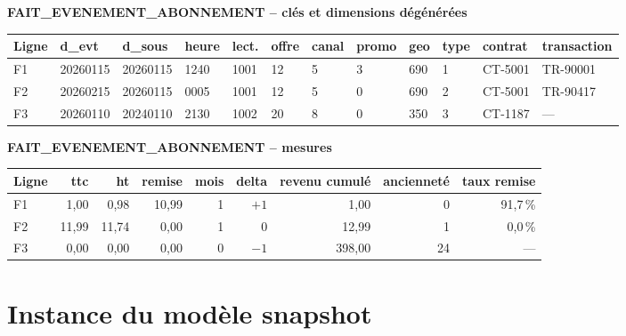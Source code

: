 \documentclass[a4paper,12pt]{article}
\begin{document}
\begin{center}
\bigskip

\textbf{FAIT\_EVENEMENT\_ABONNEMENT -- clés et dimensions dégénérées}\\[2pt]
\begin{tabular}{@{}llllllllllll@{}}
  \toprule
  Ligne & d\_evt & d\_sous & heure & lect. & offre & canal & promo & geo & type & contrat & transaction \\
  \midrule
  F1 & 20260115 & 20260115 & 1240 & 1001 & 12 & 5 & 3 & 690 & 1 & CT-5001 & TR-90001 \\
  F2 & 20260215 & 20260115 & 0005 & 1001 & 12 & 5 & 0 & 690 & 2 & CT-5001 & TR-90417 \\
  F3 & 20260110 & 20240110 & 2130 & 1002 & 20 & 8 & 0 & 350 & 3 & CT-1187 & --- \\
  \bottomrule
\end{tabular}

\medskip

\textbf{FAIT\_EVENEMENT\_ABONNEMENT -- mesures}\\[2pt]
\begin{tabular}{@{}lrrrrrrrr@{}}
  \toprule
  Ligne & ttc & ht & remise & mois & delta & revenu cumulé & ancienneté & taux remise \\
  \midrule
  F1 & 1,00  & 0,98  & 10,99 & 1 & $+1$ & 1,00   & 0  & 91,7\,\% \\
  F2 & 11,99 & 11,74 & 0,00  & 1 & $0$  & 12,99  & 1  & 0,0\,\%  \\
  F3 & 0,00  & 0,00  & 0,00  & 0 & $-1$ & 398,00 & 24 & ---      \\
  \bottomrule
\end{tabular}
\end{center}

\section{Instance du modèle snapshot}
\label{annexe:instance-snapshot}
\end{document}
